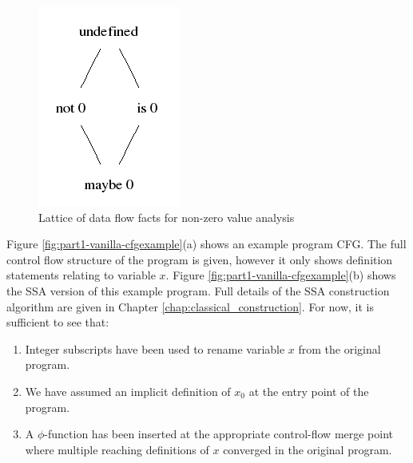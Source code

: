 \begin{figure}
  \begin{center}
  \includegraphics[scale=0.6]{zero_lattice.png}
  \end{center}
  \caption{Lattice of data flow facts for non-zero value analysis}
  \label{fig:part1-vanilla-nonzerolattice}
\end{figure}


Figure \ref{fig:part1-vanilla-cfgexample}(a) shows an example program CFG.
The full control flow structure of the program is given, however
it only shows definition
statements relating to variable $x$.
Figure \ref{fig:part1-vanilla-cfgexample}(b) shows the SSA version of this
example program. Full details of the SSA construction algorithm are given in 
Chapter \ref{chap:classical_construction}. For now, it is sufficient to see that:
\begin{enumerate}
\item Integer subscripts have been used to rename
variable $x$ from the original program.
\item We have assumed an implicit definition of $x_0$ at the entry point of
  the program.
\item A $\phi$-function has been
inserted at the appropriate control-flow merge point where multiple reaching
definitions of $x$ converged in the original program.
\end{enumerate}


